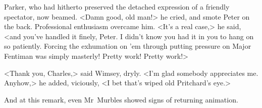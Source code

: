 Parker, who had hitherto preserved the detached expression of a friendly spectator, now beamed. <Damn good, old man!> he cried, and smote Peter on the back. Professional enthusiasm overcame him. <It's a real case,> he said, <and you've handled it finely, Peter. I didn't know you had it in you to hang on so patiently. Forcing the exhumation on 'em through putting pressure on Major Fentiman was simply masterly! Pretty work! Pretty work!>

<Thank you, Charles,> said Wimsey, dryly. <I'm glad somebody appreciates me. Anyhow,> he added, viciously, <I bet that's wiped old Pritchard's eye.>

And at this remark, even Mr~Murbles showed signs of returning animation.